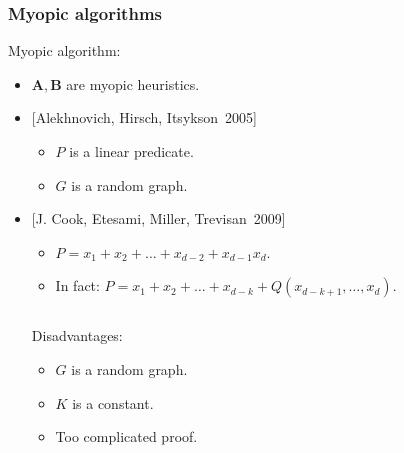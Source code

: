 \begin{frame}
    \frametitle{Myopic algorithms}

    \pause

    \begin{definition}
		Myopic algorithm:
        \begin{itemize}
	        \item $\mathbf{A}, \mathbf{B}$ are myopic heuristics.
        \end{itemize}
        
	\end{definition}

    \pause

    \begin{itemize}
    	\item{} [Alekhnovich, Hirsch, Itsykson~2005]
            \begin{itemize}
	            \item $P$ is a linear predicate.
            	\item $G$ is a random graph.
            \end{itemize}
        \pause
        \item{} [J. Cook, Etesami, Miller, Trevisan~2009] 
            \begin{itemize}
                \pause
   	            \item $P = x_1 + x_2 + \dots + x_{d - 2} + x_{d - 1}x_{d}$.
	            \item In fact: $P = x_1 + x_2 + \dots + x_{d - k} +
            		Q(x_{d - k + 1}, \dots, x_d)$.
            \end{itemize}

            	\pause
                \begin{columns}            
            	    \begin{column}{4cm}
                	    Disadvantages:
		            	\pause
           		        \begin{itemize}
		   	            	\item $G$ is a random graph.
				           	\pause
        				   	\item $K$ is a constant.
            				\pause
				           	\item Too complicated proof.            
				        \end{itemize}
                    \end{column}
                        

\end{columns}
\end{itemize}
\end{frame}
